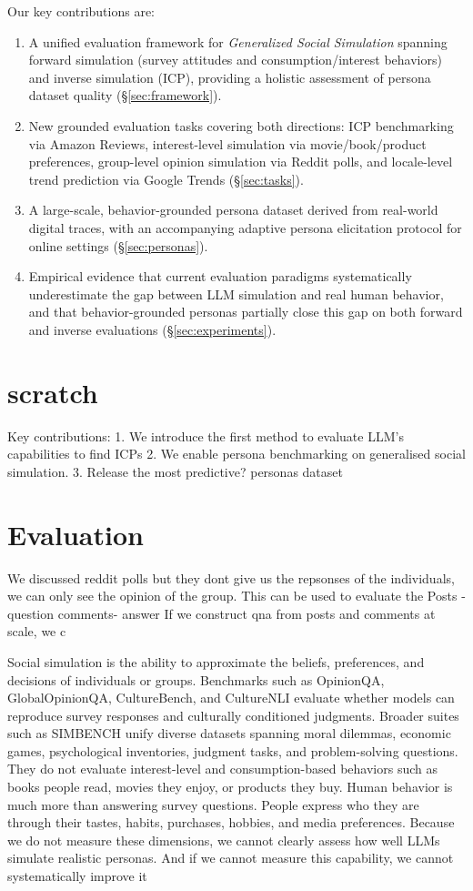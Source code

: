 \noindent Our key contributions are:
\begin{enumerate}
    \item A unified evaluation framework for \emph{Generalized Social Simulation} spanning forward simulation (survey attitudes and consumption/interest behaviors) and inverse simulation (ICP), providing a holistic assessment of persona dataset quality (\S\ref{sec:framework}).
    \item New grounded evaluation tasks covering both directions: ICP benchmarking via Amazon Reviews, interest-level simulation via movie/book/product preferences, group-level opinion simulation via Reddit polls, and locale-level trend prediction via Google Trends (\S\ref{sec:tasks}).
    \item A large-scale, behavior-grounded persona dataset derived from real-world digital traces, with an accompanying adaptive persona elicitation protocol for online settings (\S\ref{sec:personas}).
    \item Empirical evidence that current evaluation paradigms systematically underestimate the gap between LLM simulation and real human behavior, and that behavior-grounded personas partially close this gap on both forward and inverse evaluations (\S\ref{sec:experiments}).
\end{enumerate}

\section{scratch}
Key contributions:
1. We introduce the first method to evaluate LLM's capabilities to find ICPs
2. We enable persona benchmarking on generalised social simulation.
3. Release the most predictive? personas dataset 

\section{Evaluation}
We discussed reddit polls but they dont give us the repsonses of the individuals, we can only see the opinion of the group. This can be used to evaluate the
Posts - question
comments- answer
If we construct qna from posts and comments at scale, we c

Social simulation is the ability to approximate the beliefs, preferences, and decisions of individuals or groups. Benchmarks such as OpinionQA, GlobalOpinionQA, CultureBench, and CultureNLI evaluate whether models can reproduce survey responses and culturally conditioned judgments. Broader suites such as SIMBENCH unify diverse datasets spanning moral dilemmas, economic games, psychological inventories, judgment tasks, and problem-solving questions. They do not evaluate interest-level and consumption-based behaviors such as books people read, movies they enjoy, or products they buy.
Human behavior is much more than answering survey questions. People express who they are through their tastes, habits, purchases, hobbies, and media preferences. Because we do not measure these dimensions, we cannot clearly assess how well LLMs simulate realistic personas. And if we cannot measure this capability, we cannot systematically improve it

